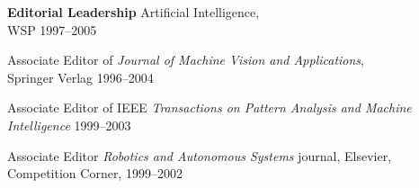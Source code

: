 \documentclass{article}
\begin{document}
\begin{cv}
\begin{cvlist} {\bf Editorial Leadership}
{    Artificial Intelligence},\\ WSP \cftdotfill{\cftdotsep} 1997--2005
  \item Associate Editor of {\em Journal of Machine Vision and
    Applications}, \\Springer Verlag \cftdotfill{\cftdotsep}
    1996--2004
  \item Associate Editor of IEEE {\em Transactions on Pattern Analysis
    and Machine\\ Intelligence} \cftdotfill{\cftdotsep} 1999--2003
  \item Associate Editor {\em Robotics and Autonomous Systems}
    journal, Elsevier, \\Competition Corner, \cftdotfill{\cftdotsep}
    1999--2002
\end{cvlist}


\end{cv}
\end{document}
